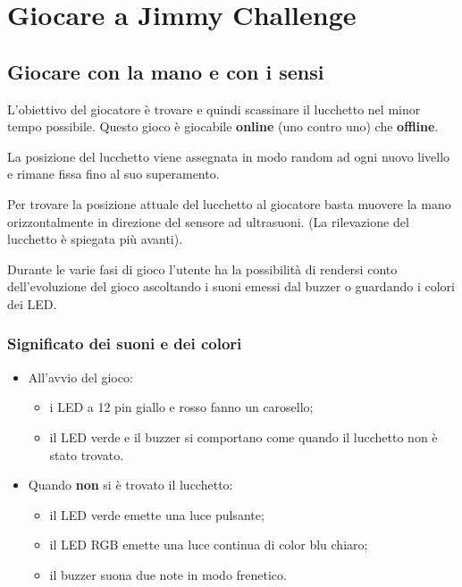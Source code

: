 \chapter{Giocare a Jimmy Challenge}
\section{Giocare con la mano e con i sensi}
L'obiettivo del giocatore è trovare e quindi scassinare il lucchetto nel minor tempo possibile. Questo gioco è giocabile \textbf{online} (uno contro uno) che \textbf{offline}.

La posizione del lucchetto viene assegnata in modo random ad ogni nuovo livello e rimane fissa fino al suo superamento.

Per trovare la posizione attuale del lucchetto al giocatore basta muovere la mano orizzontalmente in direzione del sensore ad ultrasuoni. (La rilevazione del lucchetto è spiegata più avanti).

Durante le varie fasi di gioco l'utente ha la possibilità di rendersi conto dell'evoluzione del gioco ascoltando i suoni emessi dal buzzer o guardando i colori dei LED.

\subsection{Significato dei suoni e dei colori}
\begin{itemize}
	\item All'avvio del gioco:
	\begin{itemize}
		\item i LED a 12 pin giallo e rosso fanno un carosello;
		\item il LED verde e il buzzer si comportano come quando il lucchetto non è stato trovato.
	\end{itemize}
\end{itemize}

\begin{itemize}
	\item Quando \textbf{non} si è trovato il lucchetto:
	\begin{itemize}
		\item il LED verde emette una luce pulsante;
		\item il LED RGB emette una luce continua di color blu chiaro;
		\item il buzzer suona due note in modo frenetico.
	\end{itemize}
\end{itemize}

